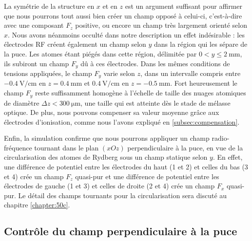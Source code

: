 La symétrie de la structure en $x$ et en $z$ est un argument suffisant pour affirmer que nous pourrons tout aussi bien créer un champ opposé à celui-ci, c'est-à-dire avec une composant $F_z$ positive, ou encore un champ très largement orienté selon $x$.
Nous avons néanmoins occulté dans notre description un effet indésirable :
les électrodes RF créent également un champ selon $y$ dans la région qui les sépare de la puce.
Les atomes étant piégés dans cette région, délimitée par $\num{0} < y \leq \SI{2}{\mm}$, ils subiront un champ $F_y$ dû à ces électrodes.
Dans les mêmes conditions de tensions appliquées, le champ $F_y$ varie selon $z$, dans un intervalle compris entre $\SI{-0.4}{\V/\cm}$ en $z=\SI{+0.4}{\mm}$ et $\SI{+0.4}{\V/\cm}$ en $z=\SI{-0.5}{\mm}$.
Fort heureusement le champ $F_y$ reste suffisamment homogène à l'échelle de taille des nuages atomiques de diamètre $\Delta z < \SI{300}{\um}$, une taille qui est atteinte dès le stade de mélasse optique.
De plus, nous pouvons compenser sa valeur moyenne grâce aux électrodes d'ionisation, comme nous l'avons expliqué en \ref{subsec:compensation}.

Enfin, la simulation confirme que nous pourrons appliquer un champ radio-fréquence tournant dans le plan $(xOz)$ perpendiculaire à la puce, en vue de la circularisation des atomes de Rydberg sous un champ statique selon $y$.
En effet, une différence de potentiel entre les électrodes du haut (1 et 2) et celles du bas (3 et 4) crée un champ $F_z$ quasi-pur et une différence de potentiel entre les électrodes de gauche (1 et 3) et celles de droite (2 et 4) crée un champ $F_x$ quasi-pur.
Le détail des champs tournants pour la circularisation sera discuté au chapitre \ref{chapter:50c}.


\subsection{Contrôle du champ perpendiculaire à la puce}


